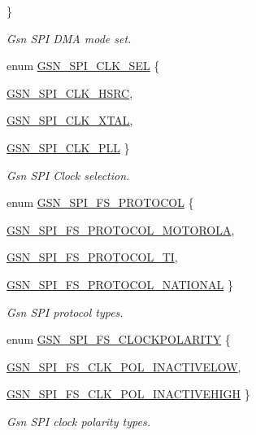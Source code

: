 \begin{DoxyCompactItemize}
 \}
\begin{DoxyCompactList}\small\item\em Gsn SPI DMA mode set. \end{DoxyCompactList}\item 
enum \hyperlink{a00655_ga26d561511c040815639b118310656f40}{GSN\_\-SPI\_\-CLK\_\-SEL} \{ \par
\hyperlink{a00655_gga26d561511c040815639b118310656f40af41fa8bd6972b83d132eed405b5fdfd5}{GSN\_\-SPI\_\-CLK\_\-HSRC}, 
\par
\hyperlink{a00655_gga26d561511c040815639b118310656f40ae499c0694c1b79936ff89f81486431f1}{GSN\_\-SPI\_\-CLK\_\-XTAL}, 
\par
\hyperlink{a00655_gga26d561511c040815639b118310656f40a55316df6045aeefd9e9491d23c481d21}{GSN\_\-SPI\_\-CLK\_\-PLL}
 \}
\begin{DoxyCompactList}\small\item\em Gsn SPI Clock selection. \end{DoxyCompactList}\item 
enum \hyperlink{a00655_ga1185ce73b403aa52f97a2b0e4146a481}{GSN\_\-SPI\_\-FS\_\-PROTOCOL} \{ \par
\hyperlink{a00655_gga1185ce73b403aa52f97a2b0e4146a481a6aaa30d8afc18068857d91cdc540fbe1}{GSN\_\-SPI\_\-FS\_\-PROTOCOL\_\-MOTOROLA}, 
\par
\hyperlink{a00655_gga1185ce73b403aa52f97a2b0e4146a481abda6a064e31740f8ea4c6109cc2c6afe}{GSN\_\-SPI\_\-FS\_\-PROTOCOL\_\-TI}, 
\par
\hyperlink{a00655_gga1185ce73b403aa52f97a2b0e4146a481a5837f1f71b5fb093062115c2b401c183}{GSN\_\-SPI\_\-FS\_\-PROTOCOL\_\-NATIONAL}
 \}
\begin{DoxyCompactList}\small\item\em Gsn SPI protocol types. \end{DoxyCompactList}\item 
enum \hyperlink{a00655_ga5d0a21479bf57ff38c1c967f95ea5e83}{GSN\_\-SPI\_\-FS\_\-CLOCKPOLARITY} \{ \par
\hyperlink{a00655_gga5d0a21479bf57ff38c1c967f95ea5e83aabbe13ebea335b5e2423a7eaafe92692}{GSN\_\-SPI\_\-FS\_\-CLK\_\-POL\_\-INACTIVELOW}, 
\par
\hyperlink{a00655_gga5d0a21479bf57ff38c1c967f95ea5e83ae452187e9202e738ad42a71388a2ea72}{GSN\_\-SPI\_\-FS\_\-CLK\_\-POL\_\-INACTIVEHIGH}
 \}
\begin{DoxyCompactList}\small\item\em Gsn SPI clock polarity types. \end{DoxyCompactList}\item 

\end{DoxyCompactItemize}
